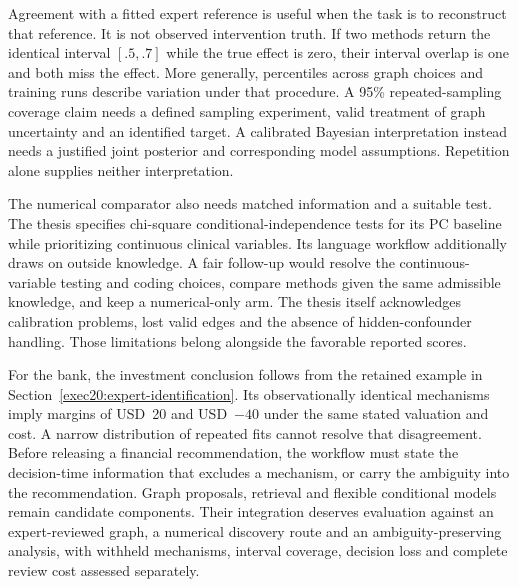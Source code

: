 Agreement with a fitted expert reference is useful when the task is to
reconstruct that reference. It is not observed intervention truth. If two
methods return the identical interval $[.5,.7]$ while the true effect is zero,
their interval overlap is one and both miss the effect. More generally,
percentiles across graph choices and training runs describe variation under
that procedure. A 95\% repeated-sampling coverage claim needs a defined
sampling experiment, valid treatment of graph uncertainty and an identified
target. A calibrated Bayesian interpretation instead needs a justified joint
posterior and corresponding model assumptions. Repetition alone supplies
neither interpretation.

The numerical comparator also needs matched information and a suitable test.
The thesis specifies chi-square conditional-independence tests for its PC
baseline while prioritizing continuous clinical variables. Its language
workflow additionally draws on outside knowledge. A fair follow-up would
resolve the continuous-variable testing and coding choices, compare methods
given the same admissible knowledge, and keep a numerical-only arm. The
thesis itself acknowledges calibration problems, lost valid edges and the
absence of hidden-confounder handling. Those limitations belong alongside
the favorable reported scores.\citep{rel64molero}

For the bank, the investment conclusion follows from the retained example in
Section~\ref{exec20:expert-identification}. Its observationally identical
mechanisms imply margins of USD~20 and USD~$-40$ under the same stated
valuation and cost. A narrow distribution of repeated fits cannot resolve
that disagreement. Before releasing a financial recommendation, the workflow
must state the decision-time information that excludes a mechanism, or carry
the ambiguity into the recommendation. Graph proposals, retrieval and flexible
conditional models remain candidate components. Their integration deserves
evaluation against an expert-reviewed graph, a numerical discovery route and
an ambiguity-preserving analysis, with withheld mechanisms, interval coverage,
decision loss and complete review cost assessed separately.
